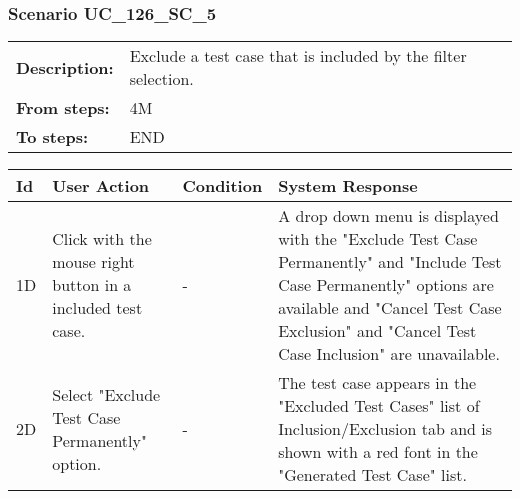 \documentclass[a4paper,11pt]{article}
\newcommand{\bl}{\\ \hline}
\begin{document}
\subsubsection*{Scenario UC_126_SC_5}
\begin{tabular}{p{1in}p{4in}}
{\bf Description:} & Exclude a test case that is included by the filter selection. \\
{\bf From steps:} & 4M \\
{\bf To steps:} & END \\
\end{tabular}
 
\begin{tabular}{|p{0.8in}|p{1.6in}|p{1.6in}|p{1.6in}|}
\hline
Id & User Action & Condition & System Response  \bl 
1D & Click with the mouse right button in a included test case. & - & A drop down menu is displayed with the "Exclude Test Case Permanently" and "Include Test Case Permanently" options are available and "Cancel Test Case Exclusion" and "Cancel Test Case Inclusion" are unavailable. \bl 
2D & Select "Exclude Test Case Permanently" option. & - & The test case appears in the "Excluded Test Cases" list of Inclusion/Exclusion tab and is shown with a red font in the "Generated Test Case" list. \bl 
\end{tabular}
\end{document}
